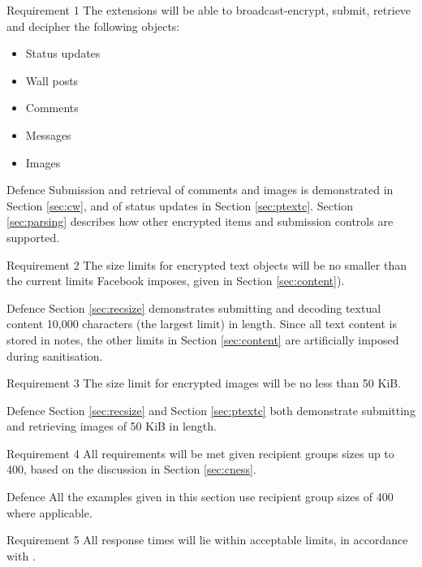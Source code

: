 \begin{desc}

    \item[Requirement 1] The extensions will be able to broadcast-encrypt, submit, retrieve and decipher the following objects:
    
    \begin{itemize}
        \item Status updates
        \item Wall posts
        \item Comments
        \item Messages
        \item Images
    \end{itemize}
    
    \item[Defence] Submission and retrieval of comments and images is demonstrated in Section \ref{sec:cw}, and of status updates in Section \ref{sec:ptextc}. Section \ref{sec:parsing} describes how other encrypted items and submission controls are supported.
    
    \item[Requirement 2] The size limits for encrypted text objects will be no smaller than the current limits Facebook imposes, given in Section \ref{sec:content}).
    
    \item[Defence] Section \ref{sec:recsize} demonstrates submitting and decoding textual content 10,000 characters (the largest limit) in length. Since all text content is stored in notes, the other limits in Section \ref{sec:content} are artificially imposed during sanitisation.

    \item[Requirement 3] The size limit for encrypted images will be no less than 50 KiB.
    
    \item[Defence] Section \ref{sec:recsize} and Section \ref{sec:ptextc} both demonstrate submitting and retrieving images of 50 KiB in length.

    \item[Requirement 4] All requirements will be met given recipient groups sizes up to 400, based on the discussion in Section \ref{sec:cness}.
    
    \item[Defence] All the examples given in this section use recipient group sizes of 400 where applicable.
    
    \item[Requirement 5] All response times will lie within acceptable limits, in accordance with \cite{response}.
    

\end{desc}
